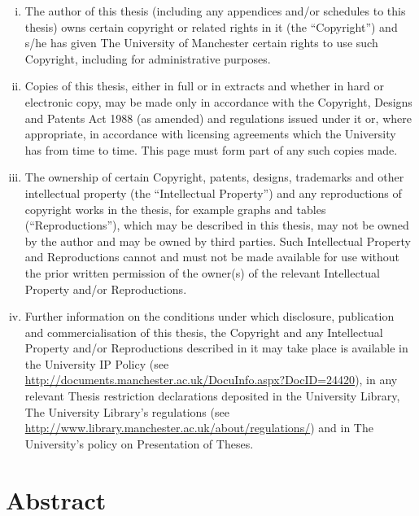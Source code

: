 \documentclass[11pt,oneside]{thesisformat}
\begin{document}
\begin{enumerate}[(i)]
\item The author of this thesis (including any appendices and/or schedules to this thesis) owns certain copyright or related rights in it (the  “Copyright”) and s/he has given The University of Manchester certain  rights to use such Copyright, including for administrative purposes.
\item Copies of this thesis, either in full or in extracts and whether in hard or electronic copy, may be made only in accordance with the Copyright, Designs and Patents Act 1988 (as  amended) and regulations issued under it or, where appropriate, in accordance with licensing agreements which the University has from time to time. This page must form part of any such copies made.
\item The ownership of certain Copyright, patents, designs, trademarks and other intellectual property (the “Intellectual Property”) and any reproductions of copyright works in the thesis, for example graphs and tables (“Reproductions”), which may be described in this thesis, may not be owned by the author and may be owned by third parties. Such Intellectual Property and Reproductions cannot and must not be made available for use without the prior written permission of the owner(s) of the relevant Intellectual Property and/or Reproductions.
\item Further information on the conditions under which disclosure, publication and commercialisation of this thesis, the Copyright and any Intellectual Property  and/or Reproductions described in it may take place is available in the University IP Policy (see \url{http://documents.manchester.ac.uk/DocuInfo.aspx?DocID=24420}), in any relevant Thesis restriction declarations deposited in the University Library, The University Library’s regulations (see \url{http://www.library.manchester.ac.uk/about/regulations/}) and in The University’s policy on Presentation of Theses.
\end{enumerate}
\chapter*{Abstract}

\end{document}
